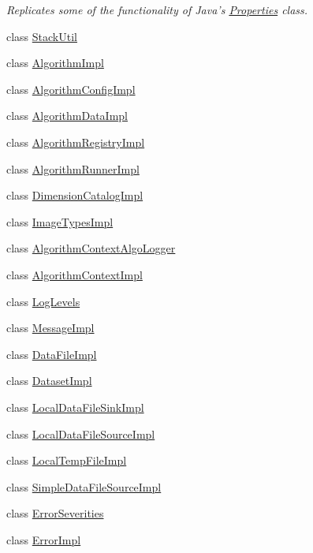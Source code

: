 \begin{DoxyCompactItemize}
\begin{DoxyCompactList}\small\item\em Replicates some of the functionality of Java's \hyperlink{classBUSBOY_1_1Properties}{Properties} class. \item\end{DoxyCompactList}\item 
class \hyperlink{classBUSBOY_1_1StackUtil}{StackUtil}
\item 
class \hyperlink{classBUSBOY_1_1AlgorithmImpl}{AlgorithmImpl}
\item 
class \hyperlink{classBUSBOY_1_1AlgorithmConfigImpl}{AlgorithmConfigImpl}
\item 
class \hyperlink{classBUSBOY_1_1AlgorithmDataImpl}{AlgorithmDataImpl}
\item 
class \hyperlink{classBUSBOY_1_1AlgorithmRegistryImpl}{AlgorithmRegistryImpl}
\item 
class \hyperlink{classBUSBOY_1_1AlgorithmRunnerImpl}{AlgorithmRunnerImpl}
\item 
class \hyperlink{classBUSBOY_1_1DimensionCatalogImpl}{DimensionCatalogImpl}
\item 
class \hyperlink{classBUSBOY_1_1ImageTypesImpl}{ImageTypesImpl}
\item 
class \hyperlink{classBUSBOY_1_1AlgorithmContextAlgoLogger}{AlgorithmContextAlgoLogger}
\item 
class \hyperlink{classBUSBOY_1_1AlgorithmContextImpl}{AlgorithmContextImpl}
\item 
class \hyperlink{classBUSBOY_1_1LogLevels}{LogLevels}
\item 
class \hyperlink{classBUSBOY_1_1MessageImpl}{MessageImpl}
\item 
class \hyperlink{classBUSBOY_1_1DataFileImpl}{DataFileImpl}
\item 
class \hyperlink{classBUSBOY_1_1DatasetImpl}{DatasetImpl}
\item 
class \hyperlink{classBUSBOY_1_1LocalDataFileSinkImpl}{LocalDataFileSinkImpl}
\item 
class \hyperlink{classBUSBOY_1_1LocalDataFileSourceImpl}{LocalDataFileSourceImpl}
\item 
class \hyperlink{classBUSBOY_1_1LocalTempFileImpl}{LocalTempFileImpl}
\item 
class \hyperlink{classBUSBOY_1_1SimpleDataFileSourceImpl}{SimpleDataFileSourceImpl}
\item 
class \hyperlink{classBUSBOY_1_1ErrorSeverities}{ErrorSeverities}
\item 
class \hyperlink{classBUSBOY_1_1ErrorImpl}{ErrorImpl}

\end{DoxyCompactItemize}
